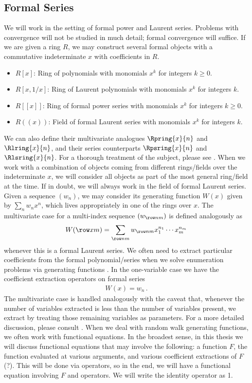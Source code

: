 \subsection{Formal Series}
We will work in the setting of formal power and Laurent series. Problems with convergence will not be studied in much detail; formal convergence will suffice. If we are given a ring $R$, we may construct several formal objects with a commutative indeterminate $x$ with coefficients in $R$.
\begin{itemize}
\item $R[x]$: Ring of polynomials with monomials $x^k$ for integers $k\ge 0$.
\item $R[x,1/x]$: Ring of Laurent polynomials with monomials $x^k$ for integers $k$.
\item $R[[x]]$: Ring of formal power series with monomials $x^k$ for integers $k \ge 0$.
\item $R((x))$: Field of formal Laurent series with monomials $x^k$ for integers $k$.
\end{itemize}
We can also define their multivariate analogues $\Rpring{x}{n}$ and $\Rlring{x}{n}$, and their series counterparts $\Rpsring{x}{n}$ and $\Rlsring{x}{n}$. For a thorough treatment of the subject, please see \cite{monforte2013formal}. When we work with a combination of objects coming from different rings/fields over the indeterminate $x$, we will consider all objects as part of the most general ring/field at the time. If in doubt, we will always work in the field of formal Laurent series. Given a sequence $(w_n)$, we may consider its generating function $W(x)$ given by $\sum_{n} w_n x^n$, which lives appropriately in one of the rings over $x$. The multivariate case for a multi-index sequence $(w_{\row nm})$ is defined analogously as
\begin{align}
	W(\row xm) = \sum_{\row nm} w_{\row nm} x_1^{n_1}\cdots x_m^{n_m}
\end{align}
whenever this is a formal Laurent series. We often need to extract particular coefficients from the formal polynomial/series when we solve enumeration problems via generating functions . In the one-variable case we have the coefficient extraction operators on formal series
\begin{align}
	[x^n] W(x) = w_n\,.
\end{align}
The multivariate case is handled analogously with the caveat that, whenever the number of variables extracted is less than the number of variables present, we extract by treating those remaining variables as parameters. For a more detailed discussion, please consult \cite{goulden2004comb}. When we deal with random walk generating functions, we often work with functional equations. In the broadest sense, in this thesis we will discuss functional equations that may involve the following: a function $F$, the function evaluated at various arguments, and various coefficient extractions of $F$ (?). This will be done via operators, so in the end, we will have a functional equation involving $F$ and operators. We will write the identity operator as 1.
